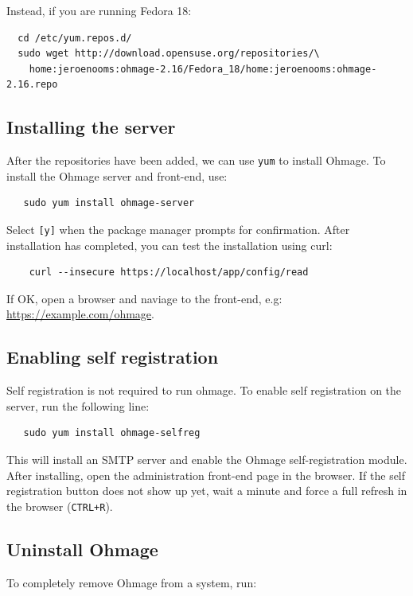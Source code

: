 \documentclass{scrartcl}
\begin{document}
\noindent Instead, if you are running Fedora 18:

\begin{verbatim}
  cd /etc/yum.repos.d/
  sudo wget http://download.opensuse.org/repositories/\
    home:jeroenooms:ohmage-2.16/Fedora_18/home:jeroenooms:ohmage-2.16.repo
\end{verbatim}

\subsection{Installing the server}

After the repositories have been added, we can use \texttt{yum} to install
Ohmage. To install the Ohmage server and front-end, use:

\begin{verbatim}
   sudo yum install ohmage-server
\end{verbatim}

\noindent Select \texttt{[y]} when the package manager prompts for confirmation.
After installation has completed, you can test the installation using curl:

\begin{verbatim}
    curl --insecure https://localhost/app/config/read
\end{verbatim}

\noindent If OK, open a browser and naviage to the front-end, e.g:
\url{https://example.com/ohmage}.

\subsection{Enabling self registration}

Self registration is not required to run ohmage. To enable self registration on
the server, run the following line:
\begin{verbatim}
   sudo yum install ohmage-selfreg
\end{verbatim}
This will install an SMTP server and enable the Ohmage self-registration module.
After installing, open the administration front-end page in the browser. If the
self registration button does not show up yet, wait a minute and force a full
refresh in the browser (\texttt{CTRL+R}).

\subsection{Uninstall Ohmage}

To completely remove Ohmage from a system, run:
\end{document}
